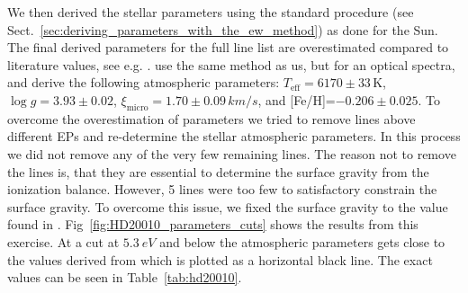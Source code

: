 \documentclass{aa}
\begin{document}
We then derived the stellar parameters using the standard procedure
(see Sect.~\ref{sec:deriving_parameters_with_the_ew_method}) as
done for the Sun. The final derived parameters for the full line
list are overestimated compared to literature values, see e.g.
\citet{Mortier2013,Gonzalez2010}. \cite{Gonzalez2010} use the same
method as us, but for an optical spectra, and derive the following
atmospheric parameters: $T_\mathrm{eff}=6170\pm33\,\si{\kelvin}$,
$\log g=3.93\pm0.02$, $\xi_\mathrm{micro}=1.70\pm0.09\,\si{km/s}$, and
[Fe/H]=$-0.206\pm0.025$. To overcome the overestimation of parameters
we tried to remove lines above different EPs and re-determine the
stellar atmospheric parameters. In this process we did not remove
any of the very few remaining  lines. The reason not to remove
the  lines is, that they are essential to determine the surface
gravity from the ionization balance. However, 5 lines were too few to
satisfactory constrain the surface gravity. To overcome this issue, we
fixed the surface gravity to the value found in \cite{Gonzalez2010}.
Fig~\ref{fig:HD20010_parameters_cuts} shows the results from this
exercise. At a cut at $\SI{5.3}{eV}$ and below
the atmospheric parameters gets close to the values derived from
\cite{Gonzalez2010} which is plotted as a horizontal black line. The
exact values can be seen in Table~\ref{tab:hd20010}.


%
%
\end{document}
